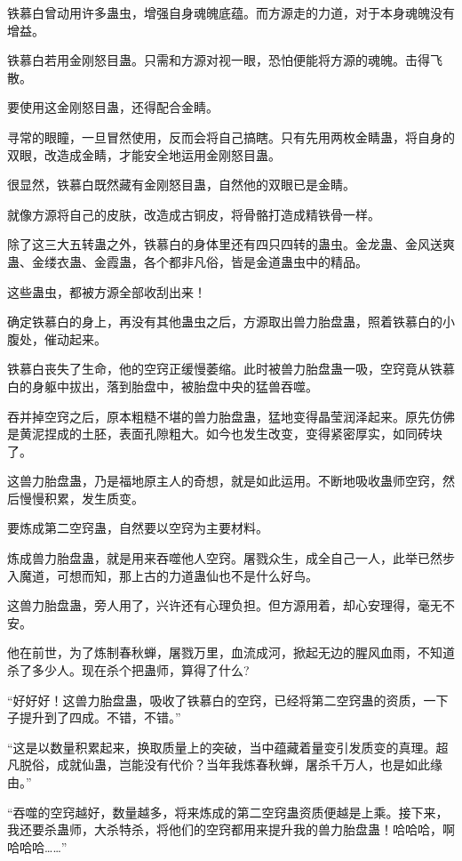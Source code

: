 \begin{this_body}
铁慕白曾动用许多蛊虫，增强自身魂魄底蕴。而方源走的力道，对于本身魂魄没有增益。

铁慕白若用金刚怒目蛊。只需和方源对视一眼，恐怕便能将方源的魂魄。击得飞散。

要使用这金刚怒目蛊，还得配合金睛。

寻常的眼瞳，一旦冒然使用，反而会将自己搞瞎。只有先用两枚金睛蛊，将自身的双眼，改造成金睛，才能安全地运用金刚怒目蛊。

很显然，铁慕白既然藏有金刚怒目蛊，自然他的双眼已是金睛。

就像方源将自己的皮肤，改造成古铜皮，将骨骼打造成精铁骨一样。

除了这三大五转蛊之外，铁慕白的身体里还有四只四转的蛊虫。金龙蛊、金风送爽蛊、金缕衣蛊、金霞蛊，各个都非凡俗，皆是金道蛊虫中的精品。

这些蛊虫，都被方源全部收刮出来！

确定铁慕白的身上，再没有其他蛊虫之后，方源取出兽力胎盘蛊，照着铁慕白的小腹处，催动起来。

铁慕白丧失了生命，他的空窍正缓慢萎缩。此时被兽力胎盘蛊一吸，空窍竟从铁慕白的身躯中拔出，落到胎盘中，被胎盘中央的猛兽吞噬。

吞并掉空窍之后，原本粗糙不堪的兽力胎盘蛊，猛地变得晶莹润泽起来。原先仿佛是黄泥捏成的土胚，表面孔隙粗大。如今也发生改变，变得紧密厚实，如同砖块了。

这兽力胎盘蛊，乃是福地原主人的奇想，就是如此运用。不断地吸收蛊师空窍，然后慢慢积累，发生质变。

要炼成第二空窍蛊，自然要以空窍为主要材料。

炼成兽力胎盘蛊，就是用来吞噬他人空窍。屠戮众生，成全自己一人，此举已然步入魔道，可想而知，那上古的力道蛊仙也不是什么好鸟。

这兽力胎盘蛊，旁人用了，兴许还有心理负担。但方源用着，却心安理得，毫无不安。

他在前世，为了炼制春秋蝉，屠戮万里，血流成河，掀起无边的腥风血雨，不知道杀了多少人。现在杀个把蛊师，算得了什么?

“好好好！这兽力胎盘蛊，吸收了铁慕白的空窍，已经将第二空窍蛊的资质，一下子提升到了四成。不错，不错。”

“这是以数量积累起来，换取质量上的突破，当中蕴藏着量变引发质变的真理。超凡脱俗，成就仙蛊，岂能没有代价？当年我炼春秋蝉，屠杀千万人，也是如此缘由。”

“吞噬的空窍越好，数量越多，将来炼成的第二空窍蛊资质便越是上乘。接下来，我还要杀蛊师，大杀特杀，将他们的空窍都用来提升我的兽力胎盘蛊！哈哈哈，啊哈哈哈……”


\end{this_body}
